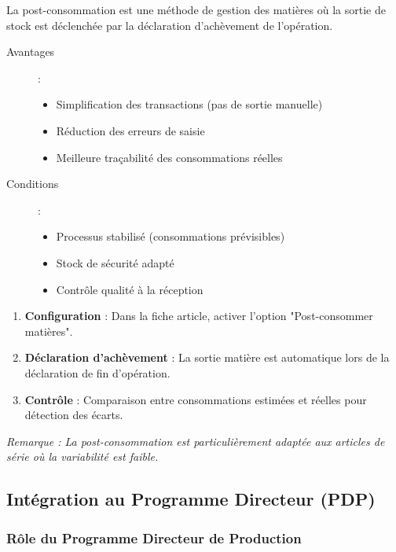 \documentclass{article}
\begin{document}
La post-consommation est une méthode de gestion des matières où la sortie de stock est déclenchée par la déclaration d'achèvement de l'opération.

\begin{description}
    \item[Avantages] :
    \begin{itemize}
        \item Simplification des transactions (pas de sortie manuelle)
        \item Réduction des erreurs de saisie
        \item Meilleure traçabilité des consommations réelles
    \end{itemize}
    \item[Conditions] :
    \begin{itemize}
        \item Processus stabilisé (consommations prévisibles)
        \item Stock de sécurité adapté
        \item Contrôle qualité à la réception
    \end{itemize}
\end{description}

\begin{tcolorbox}[colback=yellow!10!white, colframe=yellow!50!black, title=Mise en œuvre de la post-consommation]
\begin{enumerate}
    \item \textbf{Configuration} : Dans la fiche article, activer l'option "Post-consommer matières".
    \item \textbf{Déclaration d'achèvement} : La sortie matière est automatique lors de la déclaration de fin d'opération.
    \item \textbf{Contrôle} : Comparaison entre consommations estimées et réelles pour détection des écarts.
\end{enumerate}
\textit{Remarque : La post-consommation est particulièrement adaptée aux articles de série où la variabilité est faible.}
\end{tcolorbox}

\subsection{Intégration au Programme Directeur (PDP)}

\subsubsection{Rôle du Programme Directeur de Production}
\end{document}
